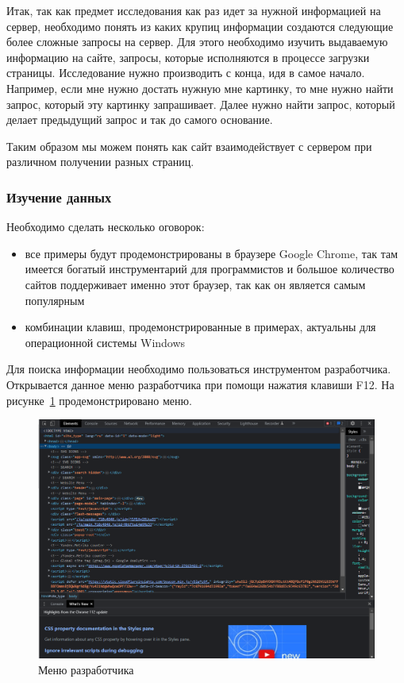 Итак, так как предмет исследования как раз идет за нужной информацией на сервер, 
необходимо понять из каких крупиц информации создаются следующие более сложные запросы на сервер.
Для этого необходимо изучить выдаваемую информацию на сайте, запросы, которые исполняются в процессе загрузки страницы.
Исследование нужно производить с конца, идя в самое начало.
Например, если мне нужно достать нужную мне картинку, то мне нужно найти запрос, который эту картинку запрашивает.
Далее нужно найти запрос, который делает предыдущий запрос и так до самого основание.

Таким образом мы можем понять как сайт взаимодействует с сервером при различном получении разных страниц.

\subsubsection{Изучение данных}
Необходимо сделать несколько оговорок:
\begin{itemize}
    \item все примеры будут продемонстрированы в браузере Google Chrome, так там имеется богатый инструментарий для программистов и большое количество сайтов поддерживает именно этот браузер, так как он является самым популярным \cite{broser-popularity-cite}
    \item комбинации клавиш, продемонстрированные в примерах, актуальны для операционной системы Windows
\end{itemize}

Для поиска информации необходимо пользоваться инструментом разработчика. Открывается данное меню разработчика при помощи нажатия клавиши F12. 
На рисунке~\ref{chrome-tools-pic} продемонстрировано меню.

\begin{figure}
    \includegraphics[scale=0.5]{imgs/chrome-tools}
    \caption{Меню разработчика}
    \label{chrome-tools-pic}
\end{figure}

